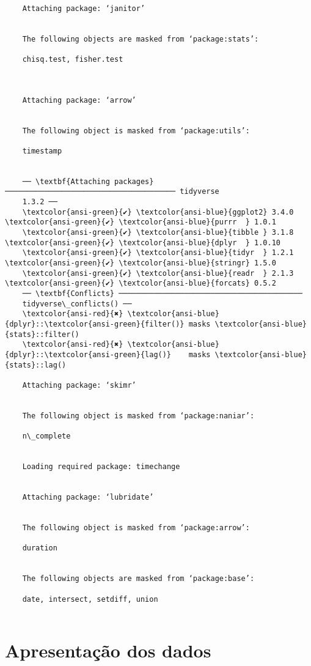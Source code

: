 \begin{Verbatim}[commandchars=\\\{\}]

    Attaching package: ‘janitor’


    The following objects are masked from ‘package:stats’:

    chisq.test, fisher.test



    Attaching package: ‘arrow’


    The following object is masked from ‘package:utils’:

    timestamp


    ── \textbf{Attaching packages} ─────────────────────────────────────── tidyverse
    1.3.2 ──
    \textcolor{ansi-green}{✔} \textcolor{ansi-blue}{ggplot2} 3.4.0      \textcolor{ansi-green}{✔} \textcolor{ansi-blue}{purrr  } 1.0.1
    \textcolor{ansi-green}{✔} \textcolor{ansi-blue}{tibble } 3.1.8      \textcolor{ansi-green}{✔} \textcolor{ansi-blue}{dplyr  } 1.0.10
    \textcolor{ansi-green}{✔} \textcolor{ansi-blue}{tidyr  } 1.2.1      \textcolor{ansi-green}{✔} \textcolor{ansi-blue}{stringr} 1.5.0
    \textcolor{ansi-green}{✔} \textcolor{ansi-blue}{readr  } 2.1.3      \textcolor{ansi-green}{✔} \textcolor{ansi-blue}{forcats} 0.5.2
    ── \textbf{Conflicts} ──────────────────────────────────────────
    tidyverse\_conflicts() ──
    \textcolor{ansi-red}{✖} \textcolor{ansi-blue}{dplyr}::\textcolor{ansi-green}{filter()} masks \textcolor{ansi-blue}{stats}::filter()
    \textcolor{ansi-red}{✖} \textcolor{ansi-blue}{dplyr}::\textcolor{ansi-green}{lag()}    masks \textcolor{ansi-blue}{stats}::lag()

    Attaching package: ‘skimr’


    The following object is masked from ‘package:naniar’:

    n\_complete


    Loading required package: timechange


    Attaching package: ‘lubridate’


    The following object is masked from ‘package:arrow’:

    duration


    The following objects are masked from ‘package:base’:

    date, intersect, setdiff, union


\end{Verbatim}

\section{Apresentação dos dados}

